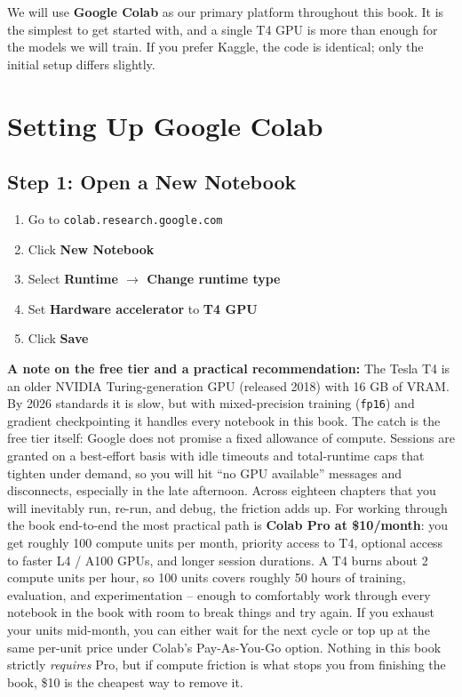 \begin{chapterenv}
We will use \textbf{Google Colab} as our primary platform throughout this book. It is the simplest to get started with, and a single T4 GPU is more than enough for the models we will train. If you prefer Kaggle, the code is identical; only the initial setup differs slightly.

\section{Setting Up Google Colab}

\subsection{Step 1: Open a New Notebook}

\begin{enumerate}[nosep]
    \item Go to \texttt{colab.research.google.com}
    \item Click \textbf{New Notebook}
    \item Select \textbf{Runtime $\rightarrow$ Change runtime type}
    \item Set \textbf{Hardware accelerator} to \textbf{T4 GPU}
    \item Click \textbf{Save}
\end{enumerate}

\begin{tipbox}
\textbf{A note on the free tier and a practical recommendation:} The Tesla T4 is an older NVIDIA Turing-generation GPU (released 2018) with 16 GB of VRAM. By 2026 standards it is slow, but with mixed-precision training (\texttt{fp16}) and gradient checkpointing it handles every notebook in this book. The catch is the free tier itself: Google does not promise a fixed allowance of compute. Sessions are granted on a best-effort basis with idle timeouts and total-runtime caps that tighten under demand, so you will hit ``no GPU available'' messages and disconnects, especially in the late afternoon. Across eighteen chapters that you will inevitably run, re-run, and debug, the friction adds up. For working through the book end-to-end the most practical path is \textbf{Colab Pro at \$10/month}: you get roughly 100 compute units per month, priority access to T4, optional access to faster L4 / A100 GPUs, and longer session durations. A T4 burns about 2 compute units per hour, so 100 units covers roughly 50 hours of training, evaluation, and experimentation -- enough to comfortably work through every notebook in the book with room to break things and try again. If you exhaust your units mid-month, you can either wait for the next cycle or top up at the same per-unit price under Colab's Pay-As-You-Go option. Nothing in this book strictly \emph{requires} Pro, but if compute friction is what stops you from finishing the book, \$10 is the cheapest way to remove it.
\end{tipbox}


\end{chapterenv}
